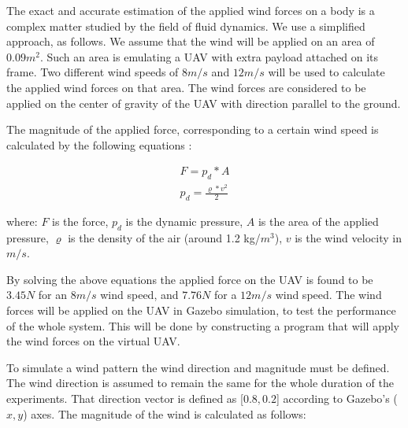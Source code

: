\documentclass[conference]{IEEEtran}
\begin{document}
The exact and accurate estimation of the applied wind forces on a body
is a complex matter studied by the field of fluid dynamics. We use a
simplified approach, as follows. We assume that the wind will be
applied on an area of \(0.09 m^2\). Such an area is emulating a UAV
with extra payload attached on its frame. Two different wind speeds of
$8 m/s$ and $12 m/s$ will be used to calculate the applied wind forces
on that area. The wind forces are considered to be applied on the
center of gravity of the UAV with direction parallel to the ground.

The magnitude of the applied force, corresponding to a certain wind
speed is calculated by the following equations
\cite{Dynamic_pressure_NASA,anderson2010fundamentals}:

\begin{equation}
    \begin{array}{l}
         F = p_{d}  * A  \\
         p_{d} = \frac{\varrho * v^2}{2} 
    \end{array}
\end{equation}

where: $F$ is the force, \(p_{d}\) is the dynamic pressure, \(A\) is
the area of the applied pressure, \(\varrho\) is the density of the
air (around 1.2 kg/\(m^3\)), \(v\) is the wind velocity in $m/s$.

By solving the above equations the applied force on the UAV is found
to be $3.45 N$ for an $8 m/s$ wind speed, and $7.76 N$ for a $12 m/s$
wind speed. The wind forces will be applied on the UAV in Gazebo
simulation, to test the performance of the whole system. This will be
done by constructing a program that will apply the wind forces on the
virtual UAV.

To simulate a wind pattern the wind direction and magnitude must be
defined. The wind direction is assumed to remain the same for the
whole duration of the experiments. That direction vector is defined as
[\(0.8, 0.2\)] according to Gazebo's (\(x,y\)) axes.
%
The magnitude of the wind is calculated as follows: %
\end{document}

